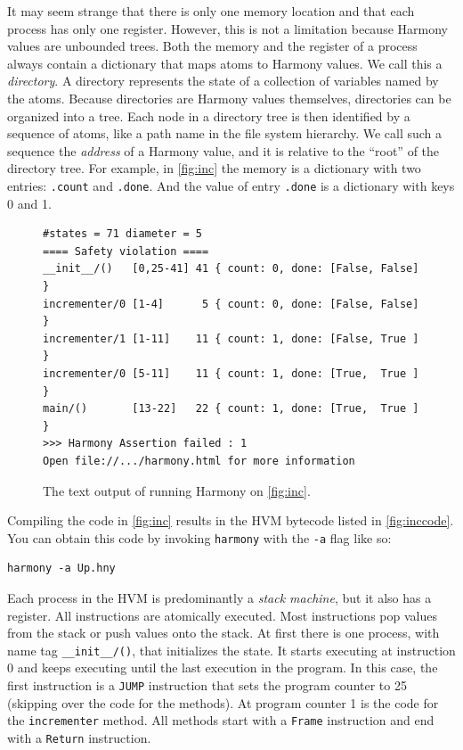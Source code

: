 \documentclass{report}
\newenvironment{code}{
\tcolorbox
}{
\endtcolorbox
}
\begin{document}
It may seem strange that there is only one memory location and that each
process has only one register.  However, this is not a limitation because
Harmony values are unbounded trees.
Both the memory and the register of a process always contain
a dictionary that maps atoms to Harmony values.  We call this a \emph{directory}.
%
A directory represents the state of a collection of variables named by the atoms.
%
Because directories are Harmony values themselves,
directories can be organized into a tree.
Each node in a directory tree is then identified
by a sequence of atoms, like a path name in the file system hierarchy.  We call
such a sequence the \emph{address}
%
of a Harmony value, and it is relative to the
``root'' of the directory tree.
For example, in \autoref{fig:inc} the memory is a dictionary with two
entries: \texttt{.count} and \texttt{.done}.  And the value of entry
\texttt{.done} is a dictionary with keys 0 and 1.

\begin{figure}
\begin{code}
\begin{verbatim}
#states = 71 diameter = 5
==== Safety violation ====
__init__/()   [0,25-41] 41 { count: 0, done: [False, False] }
incrementer/0 [1-4]      5 { count: 0, done: [False, False] }
incrementer/1 [1-11]    11 { count: 1, done: [False, True ] }
incrementer/0 [5-11]    11 { count: 1, done: [True,  True ] }
main/()       [13-22]   22 { count: 1, done: [True,  True ] }
>>> Harmony Assertion failed : 1
Open file://.../harmony.html for more information
\end{verbatim}
\end{code}
\caption{The text output of running Harmony on \autoref{fig:inc}.}
\label{fig:incoutput}
\end{figure}

%

Compiling the code in \autoref{fig:inc} results in the HVM bytecode
listed in \autoref{fig:inccode}.
You can obtain this code by invoking \texttt{harmony} with the \texttt{-a} flag
like so:
\begin{code}
\begin{verbatim}
harmony -a Up.hny
\end{verbatim}
\end{code}
Each process in the HVM is predominantly a \emph{stack machine},
%
but it also has a register.
All instructions are atomically executed.
Most instructions pop values from the stack or push values onto the stack.
At first there is one process, with name tag \texttt{\_\_init\_\_/()},
that initializes the state.
It starts executing at instruction 0 and keeps executing until the last
execution in the program.
In this case, the first instruction is a \texttt{JUMP} instruction that sets the
program counter to 25 (skipping over the code for the methods).
At program counter 1 is the code for the \texttt{incrementer} method.
All methods start with a \texttt{Frame} instruction and end with a \texttt{Return}
instruction.
\end{document}
